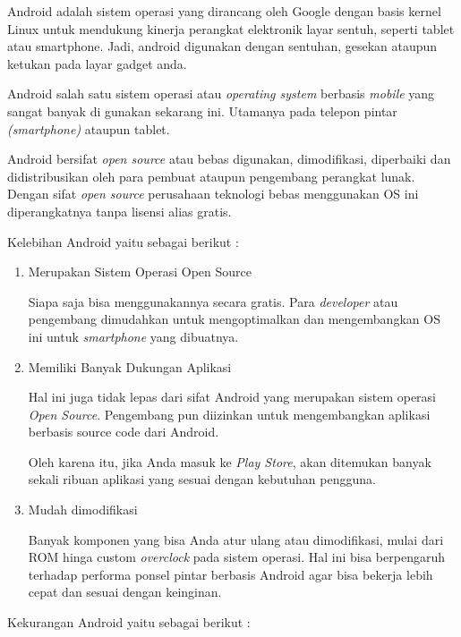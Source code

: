     \par Android adalah sistem operasi yang dirancang oleh Google dengan basis kernel Linux untuk mendukung kinerja perangkat elektronik layar sentuh, seperti tablet atau smartphone. Jadi, android digunakan dengan sentuhan, gesekan ataupun ketukan pada layar gadget anda.\\
    \par Android  salah satu sistem operasi atau \textit{operating system} berbasis \textit{mobile} yang sangat banyak di gunakan sekarang ini. Utamanya pada telepon pintar \textit{(smartphone)} ataupun tablet.\\
    \par Android bersifat \textit{open source} atau bebas digunakan, dimodifikasi, diperbaiki dan didistribusikan oleh para pembuat ataupun pengembang perangkat lunak. Dengan sifat \textit{open source} perusahaan teknologi bebas menggunakan OS ini diperangkatnya tanpa lisensi alias gratis.
    \par Kelebihan Android yaitu sebagai berikut :
    \begin{enumerate}
        \item Merupakan Sistem Operasi Open Source
\par Siapa saja bisa menggunakannya secara gratis. Para \textit{developer} atau pengembang dimudahkan untuk mengoptimalkan dan mengembangkan OS ini untuk \textit{smartphone} yang dibuatnya.

\item Memiliki Banyak Dukungan Aplikasi
\par Hal ini juga tidak lepas dari sifat Android yang merupakan sistem operasi \textit{Open Source}. Pengembang pun diizinkan untuk mengembangkan aplikasi berbasis source code dari Android.

\par Oleh karena itu, jika Anda masuk ke \textit{Play Store}, akan ditemukan banyak sekali ribuan aplikasi yang sesuai dengan kebutuhan pengguna.

\item Mudah dimodifikasi
\par Banyak komponen yang bisa Anda atur ulang atau dimodifikasi, mulai dari ROM  hinga custom \textit{overclock} pada sistem operasi. Hal ini bisa berpengaruh terhadap performa ponsel pintar berbasis Android agar bisa bekerja lebih cepat dan sesuai dengan keinginan.
\end{enumerate}
\par Kekurangan Android yaitu sebagai berikut :
